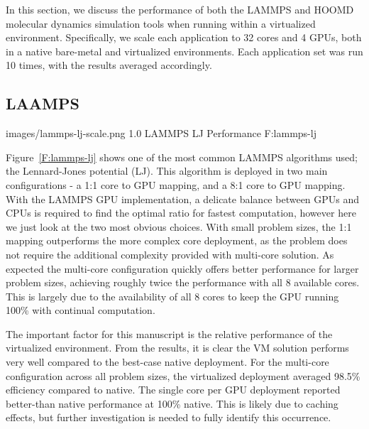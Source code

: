 \documentclass{sigplanconf}
\begin{document}
In this section, we discuss the performance of both the LAMMPS and HOOMD molecular dynamics simulation tools when running within a virtualized environment. Specifically, we scale each application to 32 cores and 4 GPUs, both in a native bare-metal and virtualized environments.  Each application set was run 10 times, with the results averaged accordingly. 

\subsection{LAAMPS}

  {images/lammps-lj-scale.png}
  {1.0}
  {LAMMPS LJ Performance}
  {F:lammps-lj}


Figure~\ref{F:lammps-lj} shows one of the most common LAMMPS algorithms used; the Lennard-Jones potential (LJ).  This algorithm is deployed in two main configurations - a 1:1 core to GPU mapping, and a 8:1 core to GPU mapping.  With the LAMMPS GPU implementation, a delicate balance between GPUs and CPUs is required to find the optimal ratio for fastest computation, however here we just look at the two most obvious choices. With small problem sizes, the 1:1 mapping outperforms the more complex core deployment, as the problem does not require the additional complexity provided with multi-core solution.  As expected the multi-core configuration quickly offers better performance for larger problem sizes, achieving roughly twice the performance with all 8 available cores. This is largely due to the availability of all 8 cores to keep the GPU running 100\% with continual computation.
 
The important factor for this manuscript is the relative performance of the virtualized environment. From the results, it is clear the VM solution performs very well compared to the best-case native deployment. For the multi-core configuration across all problem sizes, the virtualized deployment averaged 98.5\% efficiency compared to native. The single core per GPU deployment reported better-than native performance at 100\% native.  This is likely due to caching effects, but further investigation is needed to fully identify this occurrence. 

\end{document}
